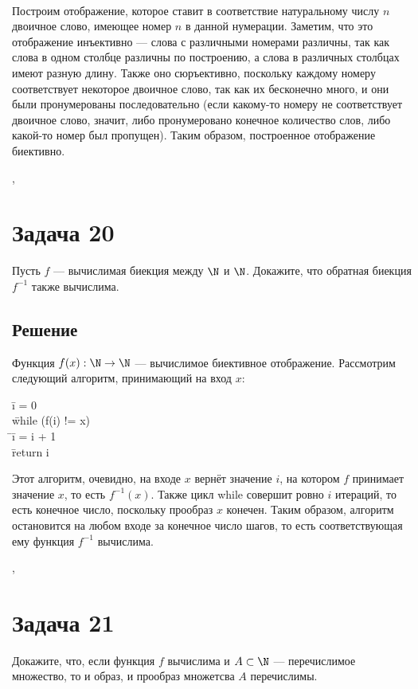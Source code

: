 \documentclass[a4paper,12pt]{article}
\newcommand {\gu} [1] {\guillemotleft#1\guillemotright}
\newcommand{\tab}{\quad\=}
\newenvironment{programm}{
    \ttfamily
    \smallskip
    \begin{tabbing}
    }
    {
    \end{tabbing}
    \smallskip
}
\begin{document}
	\bigskip
	\\
	Построим отображение, которое ставит в соответствие натуральному числу $n$ двоичное слово, имеющее номер $n$ в данной нумерации. Заметим, что это отображение инъективно --- слова с различными номерами различны, так как слова в одном столбце различны по построению, а слова в различных столбцах имеют разную длину. Также оно сюръективно, поскольку каждому номеру соответствует некоторое двоичное слово, так как их бесконечно много, и они были пронумерованы последовательно (если какому-то номеру не соответствует двоичное слово, значит, либо пронумеровано конечное количество слов, либо какой-то номер был \gu{пропущен}). Таким образом, построенное отображение биективно.

	\sep	
		
		
	\section*{Задача 20}
	Пусть $f$ --- вычислимая биекция между $\N$ и $\N$. Докажите, что обратная биекция $f^{-1}$ также вычислима.

	
	\subsection*{Решение}
	Функция $f(x):\N\to\N$ --- вычислимое биективное отображение. Рассмотрим следующий алгоритм, принимающий на вход $x$:
	\begin{programm}
	\tab i = 0\\
	\tab while (f(i) != x)\\
	\tab\tab i = i + 1\\
	\tab return i
	\end{programm}
    Этот алгоритм, очевидно, на входе $x$ вернёт значение $i$, на котором $f$ принимает значение $x$, то есть $f^{-1}(x)$. Также цикл {\ttfamily while} совершит ровно $i$ итераций, то есть конечное число, поскольку прообраз $x$ конечен. Таким образом, алгоритм остановится на любом входе за конечное число шагов, то есть соответствующая ему функция $f^{-1}$ вычислима.

	\sep		
	
	
	
	
	\section*{Задача 21}
    Докажите, что, если функция $f$ вычислима и $A \subset \N$ --- перечислимое множество, то и образ, и прообраз множетсва $A$ перечислимы.
	
\end{document}
